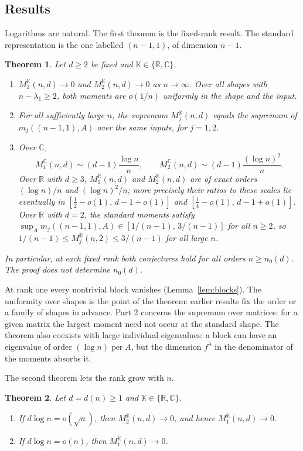 \documentclass[11pt,a4paper]{article}
\newtheorem{theorem}{Theorem}[section]
\theoremstyle{remark}
\newcommand{\per}{\operatorname{per}}
\newcommand{\R}{\mathbb R}
\newcommand{\C}{\mathbb C}
\newcommand{\K}{\mathbb K}
\begin{document}
\subsection{Results}
Logarithms are natural. The first theorem is the fixed-rank result. The standard representation is the one labelled $(n-1,1)$, of dimension $n-1$.
\begin{theorem}\label{thm:main}
Let $d\ge2$ be fixed and $\K\in\{\R,\C\}$.
\begin{enumerate}
\item $M_1^\K(n,d)\to0$ and $M_2^\K(n,d)\to0$ as $n\to\infty$. Over all shapes with $n-\lambda_1\ge2$, both moments are $o(1/n)$ uniformly in the shape and the input.
\item For all sufficiently large $n$, the supremum $M_j^\K(n,d)$ equals the supremum of $m_j((n-1,1),A)$ over the same inputs, for $j=1,2$.
\item Over $\C$,
\[
 M_1^\C(n,d)\sim(d-1)\frac{\log n}{n},\qquad M_2^\C(n,d)\sim(d-1)\frac{(\log n)^2}{n}.
\]
Over $\R$ with $d\ge3$, $M_1^\R(n,d)$ and $M_2^\R(n,d)$ are of exact orders $(\log n)/n$ and $(\log n)^2/n$; more precisely their ratios to these scales lie eventually in $[\frac12-o(1),\,d-1+o(1)]$ and $[\frac14-o(1),\,d-1+o(1)]$. Over $\R$ with $d=2$, the standard moments satisfy $\sup_Am_j((n-1,1),A)\in[1/(n-1),\,3/(n-1)]$ for all $n\ge2$, so $1/(n-1)\le M_j^\R(n,2)\le3/(n-1)$ for all large $n$.
\end{enumerate}
In particular, at each fixed rank both conjectures hold for all orders $n\ge n_0(d)$. The proof does not determine $n_0(d)$.
\end{theorem}
At rank one every nontrivial block vanishes (Lemma~\ref{lem:blocks}). The uniformity over shapes is the point of the theorem: earlier results fix the order or a family of shapes in advance. Part 2 concerns the supremum over matrices: for a given matrix the largest moment need not occur at the standard shape. The theorem also coexists with large individual eigenvalues: a block can have an eigenvalue of order $(\log n)\per A$, but the dimension $f^\lambda$ in the denominator of the moments absorbs it.

The second theorem lets the rank grow with $n$.
\begin{theorem}\label{thm:growing}
Let $d=d(n)\ge1$ and $\K\in\{\R,\C\}$.
\begin{enumerate}
\item If $d\log n=o(\sqrt n)$, then $M_2^\K(n,d)\to0$, and hence $M_1^\K(n,d)\to0$.
\item If $d\log n=o(n)$, then $M_1^\K(n,d)\to0$.
\end{enumerate}
\end{theorem}
\end{document}
